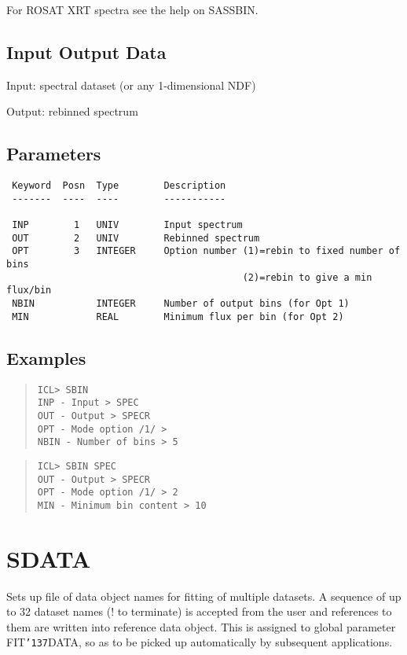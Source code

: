 \documentclass{book}
\renewcommand{\_}{{\tt\char'137}}     %
\begin{document}
For ROSAT XRT spectra see the help on SASSBIN.

\subsection{Input Output Data}
Input: spectral dataset (or any 1-dimensional NDF)

Output: rebinned spectrum

\subsection{Parameters}
\begin{verbatim}
 Keyword  Posn  Type        Description
 -------  ----  ----        -----------

 INP        1   UNIV        Input spectrum
 OUT        2   UNIV        Rebinned spectrum
 OPT        3   INTEGER     Option number (1)=rebin to fixed number of bins
                                          (2)=rebin to give a min flux/bin
 NBIN           INTEGER     Number of output bins (for Opt 1)
 MIN            REAL        Minimum flux per bin (for Opt 2)

\end{verbatim}\subsection{Examples}
\begin{quote}\begin{verbatim}
ICL> SBIN
INP - Input > SPEC
OUT - Output > SPECR
OPT - Mode option /1/ >
NBIN - Number of bins > 5
\end{verbatim}\end{quote}
\begin{quote}\begin{verbatim}
ICL> SBIN SPEC
OUT - Output > SPECR
OPT - Mode option /1/ > 2
MIN - Minimum bin content > 10
\end{verbatim}\end{quote}
\section{SDATA}
Sets up file of data object names for fitting of multiple
datasets. A sequence of up to 32 dataset names (! to terminate)
is accepted from the user and references to them are written into
reference data object. This is assigned to global parameter
FIT\_DATA, so as to be picked up automatically by subsequent
applications.
\end{document}
